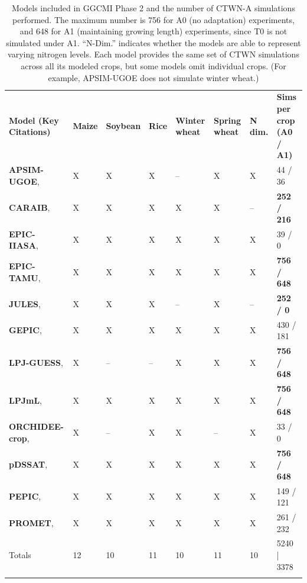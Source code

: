 \documentclass[gmd, manuscript]{copernicus} %
\begin{document}
\begin{table}[t]
\caption{
Models included in GGCMI Phase 2 and the number of CTWN-A simulations performed. 
The maximum number is 756 for A0 (no adaptation) experiments, and 648 for A1 (maintaining growing length) experiments, since T0 is not simulated under A1. ``N-Dim.'' indicates whether the models are able to represent varying nitrogen levels.
Each model provides the same set of CTWN simulations across all its modeled crops, but some models omit individual crops. (For example, APSIM-UGOE does not simulate winter wheat.)
}
\label{table:models}
  \begin{tabular}{p{6cm} p{1cm} p{1cm} p{1cm} p{1cm} p{1cm} p{1cm} p{1.9cm}}
    \tophline
    {\textbf{Model (Key Citations)}}&{\textbf{Maize}}&{\textbf{Soybean}}&{\textbf{Rice}}&{\textbf{Winter wheat}}&{\textbf{Spring wheat}}&{\textbf{N dim.}}&{\textbf{Sims per crop (A0 / A1)}}\\ \middlehline
    {\textbf{APSIM-UGOE},    \citet{KEATING2003267, HOLZWORTH2014327}} & {X} & {X} & {X} & {--} & {X} & {X} & {44 / 36}\\ \middlehline
    {\textbf{CARAIB},        \citet{Dury2011, Pirttioja2015}}  & {X} & {X} & {X} & {X} & {X} & {--} & {\textbf{252 / 216}}\\ \middlehline
    {\textbf{EPIC-IIASA},    \citet{BALKOVIC2014}} & {X} & {X} & {X} & {X} & {X} & {X} & {39 / 0}\\  \middlehline
    {\textbf{EPIC-TAMU},     \citet{Izaurralde06}} & {X} & {X} & {X} & {X} & {X} & {X} & {\textbf{756 / 648}}\\ \middlehline
    {\textbf{JULES},         \citet{Osborne2015, Williams2015, Williams2017}} & {X} & {X} & {X} & {--} & {X} & {--} & {\textbf{252 / 0}}\\ \middlehline
    {\textbf{GEPIC},         \citet{LIU2007478, FOLBERTH201221}} & {X} & {X} & {X} & {X} & {X} & {X} & {430 / 181}\\ \middlehline
    {\textbf{LPJ-GUESS},     \citet{Lindeskog2013, Olin2015}} & {X} & {--} & {--} & {X} & {X} & {X} & {\textbf{756 / 648}}\\  \middlehline
    {\textbf{LPJmL},         \citet{von_Bloh_implementing_2018}} & {X} & {X} & {X} & {X} & {X} & {X} & {\textbf{756 / 648}}\\ \middlehline
    {\textbf{ORCHIDEE-crop}, \citet{Wu2016}} & {X} & {--}  & {X} & {X} & {--} & {X} & {33 / 0}\\ \middlehline
    {\textbf{pDSSAT},        \citet{Elliott2014b, JONES2003235}} & {X} & {X} & {X} & {X} & {X} & {X} & {\textbf{756 / 648}}\\ \middlehline
    {\textbf{PEPIC},         \citet{LIU2016164, LIU2016}}  & {X} & {X} & {X} & {X} & {X} & {X} & {149 / 121}\\ \middlehline
    {\textbf{PROMET},        \citet{Hank2015, MAUSER2015}} & {X} & {X} & {X} & {X} & {X} & {X} & {261 / 232}\\ \middlehline
    {Totals} & {12} & {10} & {11} & {10} & {11} & {10} & {5240 | 3378}\\
    \bottomhline
  \end{tabular}
\end{table}
\end{document}
